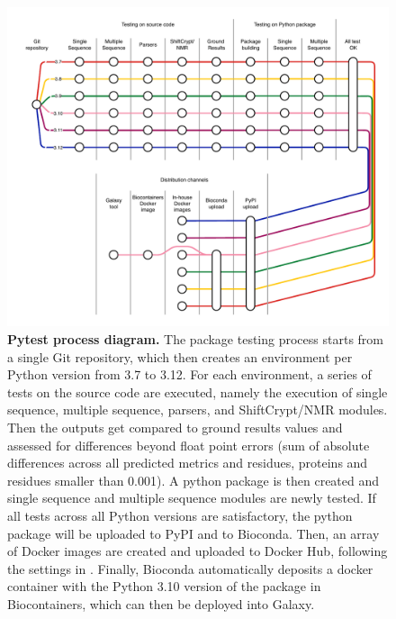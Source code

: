 \begin{figure}[!t]%
\includegraphics[width=\linewidth]{b2b_deployment/Fig/pytest_turn_bar_310.pdf}  
\centering
\caption{\textbf{Pytest process diagram.} The package testing process starts from a single Git repository, which then creates an environment per Python version from 3.7 to 3.12. For each environment, a series of tests on the source code are executed, namely the execution of single sequence, multiple sequence, parsers, and ShiftCrypt/NMR modules. Then the outputs get compared to ground results values and assessed for differences beyond float point errors (sum of absolute differences across all predicted metrics and residues, proteins and residues smaller than 0.001). A python package is then created and single sequence and multiple sequence modules are newly tested. If all tests across all Python versions are satisfactory, the python package will be uploaded to PyPI and to Bioconda. Then, an array of Docker images are created and uploaded to Docker Hub, following the settings in . Finally, Bioconda automatically deposits a docker container with the Python 3.10 version of the package in Biocontainers, which can then be deployed into Galaxy.}
\label{pytest}
\end{figure}


\endgroup